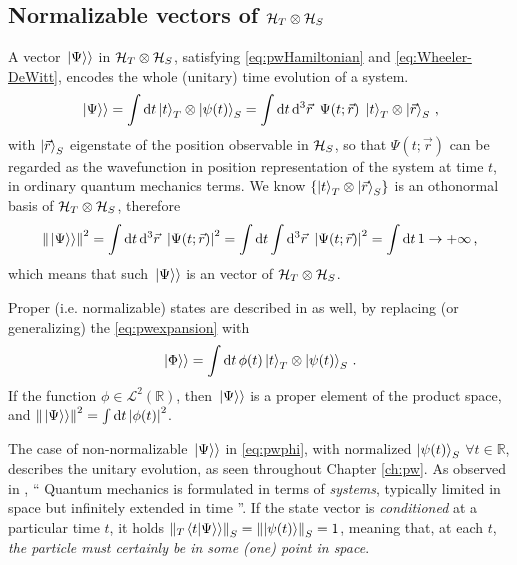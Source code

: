 \subsection{Normalizable vectors of $\mathcal{H}_T \otimes \mathcal{H}_S$}
\label{sec:properpw}

A vector $\left.\left| \Psi \right\rangle\right\rangle$ in $\mathcal{H}_T \otimes \mathcal{H}_S$,
satisfying \eqref{eq:pwHamiltonian} and \eqref{eq:Wheeler-DeWitt},
encodes the whole (unitary) time evolution of a system.
\begin{equation}\label{eq:pwexpansion}
  \left.\left| \Psi \right\rangle\right\rangle =
    \int \dd{t} \ket{t}_T \otimes \ket{\psi(t)}_S =
    \int \dd{t}\dd[3]{\vec{r}} \ \Psi(t; \vec{r}) \; \ket{t}_T \otimes \ket{\vec{r}}_S
    \,  \text{,}
\end{equation}
with $\ket{\vec{r}}_S$ eigenstate of the position observable in $\mathcal{H}_S$,
so that $\Psi(t; \vec{r})$ can be regarded as the wavefunction in position representation of the system at time $t$,
in ordinary quantum mechanics terms.
We know $\left\{\ket{t}_T \otimes \ket{\vec{r}}_S\right\}$ is an othonormal basis of $\mathcal{H}_T \otimes \mathcal{H}_S$, therefore
\begin{equation}
  \norm{\left.\left| \Psi \right\rangle\right\rangle}^2 =
    \int \dd{t}\dd[3]{\vec{r}} \ \abs{\Psi(t; \vec{r})}^2 =
    \int \dd{t} \int \dd[3]{\vec{r}} \ \abs{\Psi(t; \vec{r})}^2 =
    \int \dd{t} 1 \rightarrow +\infty
    \,  \text{,}
\end{equation}
which means that such $\left.\left| \Psi \right\rangle\right\rangle$ is an  vector of $\mathcal{H}_T \otimes \mathcal{H}_S$.

Proper (i.e. normalizable) states are described in \citereset\cite{Lloyd:Time} as well, by replacing (or generalizing)
the \eqref{eq:pwexpansion} with
\begin{equation}\label{eq:pwphi}
  \left.\left| \Phi \right\rangle\right\rangle =
    \int \dd{t} \phi(t) \ket{t}_T \otimes \ket{\psi(t)}_S \, \text{.}
\end{equation}
If the function $\phi \in \mathscr{L}^2(\mathbb{R})$,
then $\left.\left| \Psi \right\rangle\right\rangle$ is a proper element of the product space,
and $\norm{\left.\left| \Psi \right\rangle\right\rangle}^2 = \int \dd{t} \abs{\phi(t)}^2$.

The case of non-normalizable $\left.\left| \Psi \right\rangle\right\rangle$ in \eqref{eq:pwphi},
with normalized $\ket{\psi(t)}_S$ $\forall t \in \mathbb{R}$,
describes the unitary evolution, as seen throughout Chapter \ref{ch:pw}.
As observed in \cite{Maccone:QGR},
``%
  Quantum mechanics is formulated in terms of \emph{systems},
  typically limited in space but infinitely extended in time%
''.
If the state vector is \emph{conditioned} at a particular time $t$,
it holds $\norm{_{T}\!\left.\left\langle t \middle| \Psi \right\rangle\right\rangle}_S = \norm{\ket{\psi(t)}}_S = 1$,
meaning that, at each $t$,
\emph{the particle must certainly be in some (one) point in space}.

